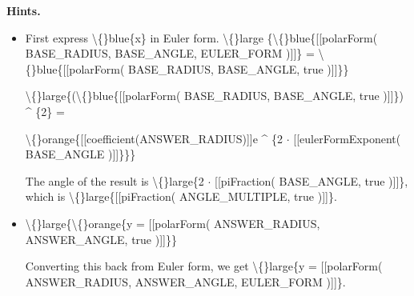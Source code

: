 \documentclass{article}
\begin{document}
\textbf{Hints.}
\begin{itemize}
  \item First express \textbackslash\{\}blue\{x\} in Euler form.
                        \textbackslash\{\}large \{\textbackslash\{\}blue\{[[polarForm( BASE\_RADIUS, BASE\_ANGLE, EULER\_FORM )]]\} = \textbackslash\{\}blue\{[[polarForm( BASE\_RADIUS, BASE\_ANGLE, true )]]\}\}
                    

                    
                        
                            \textbackslash\{\}large\{(\textbackslash\{\}blue\{[[polarForm( BASE\_RADIUS, BASE\_ANGLE, true )]]\}) \textasciicircum{} \{2\} =
                            
                            \textbackslash\{\}orange\{[[coefficient(ANSWER\_RADIUS)]]e \textasciicircum{} \{2 $\cdot$ [[eulerFormExponent( BASE\_ANGLE )]]\}\}\}
                        
                        
                    

                    
                        The angle of the result is \textbackslash\{\}large\{2 $\cdot$ [[piFraction( BASE\_ANGLE, true )]]\},
                        which is \textbackslash\{\}large\{[[piFraction( ANGLE\_MULTIPLE, true )]]\}.
  \item \textbackslash\{\}large\{\textbackslash\{\}orange\{y = [[polarForm( ANSWER\_RADIUS, ANSWER\_ANGLE, true )]]\}\}
                    
                        Converting this back from Euler form, we get
                        \textbackslash\{\}large\{y = [[polarForm( ANSWER\_RADIUS, ANSWER\_ANGLE, EULER\_FORM )]]\}.
\end{itemize}
\end{document}
